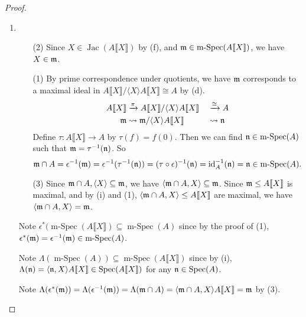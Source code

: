 \begin{proof}
\begin{enumerate}
        \item 
            \begin{enumerate}
                \item [(2)]
                    Since $X \in \operatorname{Jac}(A\llbracket X \rrbracket)$ by (f), and $\mathfrak{m} \in \operatorname{m-Spec}(A\llbracket X \rrbracket)$, we have $X \in \mathfrak{m}$. 
                \item [(1)]
                    By prime correspondence under quotients, we have $\mathfrak{m}$ corresponds to a maximal ideal in $A\llbracket X \rrbracket/\langle X \rangle A \llbracket X \rrbracket \cong A$ by (d).
                    \begin{alignat*}{2}
                        A\llbracket X \rrbracket &\xrightarrow{\pi} A\llbracket X \rrbracket/\langle X \rangle A\llbracket X \rrbracket &&\xrightarrow \cong A \\
                        \mathfrak{m} &\leadsto \mathfrak{m}/\langle X \rangle A\llbracket X \rrbracket &&\leadsto \mathfrak{n}
                    \end{alignat*}
                    Define $\tau: A\llbracket X \rrbracket \to A$ by $\tau(f) = f(0)$. Then we can find $\mathfrak{n} \in \operatorname{m-Spec}(A)$ such that $\mathfrak{m} = \tau^{-1}(\mathfrak{n})$. So 
                    \[\mathfrak{m} \cap A = \epsilon^{-1}(\mathfrak{m}) = \epsilon^{-1}(\tau^{-1} (\mathfrak{n})) = (\tau \circ \epsilon)^{-1}(\mathfrak{n}) = \operatorname{id}_A^{-1}(\mathfrak{n}) = \mathfrak{n} \in \operatorname{m-Spec}(A).\]
                \item [(3)] Since $\mathfrak{m} \cap A, \langle X \rangle \subseteq \mathfrak{m}$, we have $\langle \mathfrak{m} \cap A,X \rangle \subseteq \mathfrak{m}$. Since $\mathfrak{m} \leq A\llbracket X \rrbracket$ is maximal, and by (i) and (1), $\langle \mathfrak{m} \cap A,X \rangle \leq A \llbracket X \rrbracket$ are maximal, we have $\langle \mathfrak{m} \cap A,X \rangle = \mathfrak{m}$.
            \end{enumerate} 
            \par Note $\epsilon^*(\operatorname{m-Spec}(A\llbracket X \rrbracket) \subseteq \operatorname{m-Spec}(A)$ since by the proof of (1), $\epsilon^*(\mathfrak{m}) = \epsilon^{-1}(\mathfrak{m}) \in \operatorname{m-Spec}(A)$. \par 
            Note $\Lambda (\operatorname{m-Spec}(A)) \subseteq \operatorname{m-Spec}(A\llbracket X \rrbracket)$ since by (i), $\Lambda(\mathfrak{n}) = \langle \mathfrak{n},X \rangle A\llbracket X \rrbracket \in \operatorname{Spec}(A\llbracket X \rrbracket)$ for any $\mathfrak{n} \in \operatorname{Spec}(A)$. \par 
            Note $\Lambda(\epsilon^*(\mathfrak{m})) = \Lambda (\epsilon^{-1}(\mathfrak{m})) = \Lambda (\mathfrak{m} \cap A) = \langle \mathfrak{m} \cap A,X \rangle A\llbracket X \rrbracket = \mathfrak{m}$ by (3). \par 

\end{enumerate}
\end{proof}
